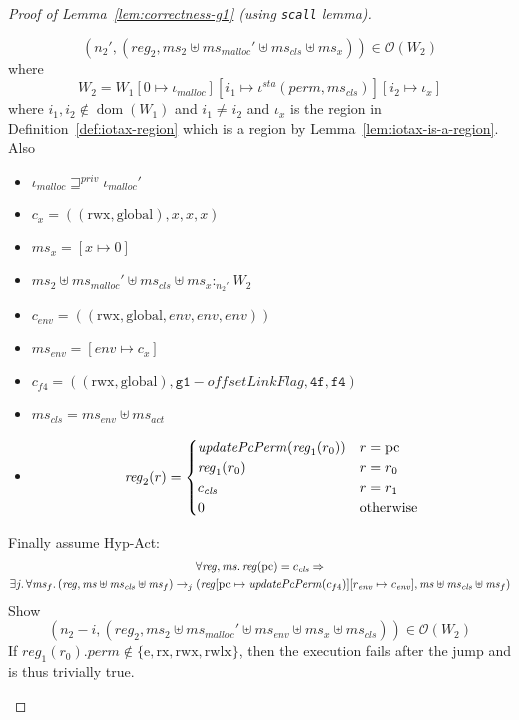 \documentclass[a4paper]{article}
\newcommand{\update}[2]{[#1 \mapsto #2]}
\DeclareMathOperator{\dom}{dom}
\newcommand{\var}[1]{\mathit{#1}}
\newcommand{\hs}{\var{ms}}
\newcommand{\ms}{\hs}
\newcommand{\pcreg}{\mathrm{pc}}
\newcommand{\reg}{\var{reg}}
\newcommand{\heap}{\var{mem}}
\newcommand{\perm}{\var{perm}}
\newcommand{\sta}{\var{sta}}
\newcommand{\olf}{\var{offsetLinkFlag}}
\newcommand{\env}{\var{env}}
\newcommand{\cls}{\var{cls}}
\newcommand{\act}{\var{act}}
\newcommand{\plainfun}[2]{
  \ifthenelse{\equal{#2}{}}
  {\mathit{#1}}
  {\mathit{#1}(#2)}
}
\newcommand{\updatePcPerm}[1]{\plainfun{updatePcPerm}{#1}}
\newcommand{\futurestr}{\mathbin{\sqsupseteq}^{\var{priv}}}
\newcommand{\heapSat}[3][\heap]{#1 :_{#2} #3}
\newcommand{\memSat}[3][n]{\heapSat[#2]{#1}{#3}}
\newcommand{\codelabel}[1]{\mathit{#1}}
\newcommand{\malloc}{\codelabel{malloc}}
\newcommand{\observations}{\mathcal{O}}
\newcommand{\npair}[2][n]{\left(#1,#2 \right)}
\newcommand{\plainperm}[1]{\mathrm{#1}}
\newcommand{\exec}{\plainperm{rx}}
\newcommand{\entry}{\plainperm{e}}
\newcommand{\rwx}{\plainperm{rwx}}
\newcommand{\rwlx}{\plainperm{rwlx}}
\newcommand{\glob}{\plainperm{global}}
\newcommand{\step}[1][]{\rightarrow_{#1}}
\begin{document}
\begin{proof}[Proof of Lemma~\ref{lem:correctness-g1} (using \texttt{scall} lemma)]
\begin{enumproof}[resume]
\begin{enumproof}
          \[
            \npair[n_2']{(\reg_2,\ms_2 \uplus \ms_\malloc' \uplus \ms_\cls \uplus \ms_x)} \in \observations(W_2)
          \]
          where
          \[
            W_2 = W_1\update{0}{\iota_\malloc}\update{i_1}{\iota^\sta (\perm,\ms_\cls)}\update{i_2}{\iota_x}
          \]
          where $i_1,i_2\not\in\dom(W_1)$ and $i_1 \neq i_2$ and $\iota_x$ is the region in Definition~\ref{def:iotax-region} which is a region by Lemma~\ref{lem:iotax-is-a-region}. Also
          \begin{itemize}
          \item $\iota_\malloc \futurestr \iota_\malloc'$
          \item $c_x = ((\rwx,\glob),x,x,x)$
          \item $\ms_x = [x \mapsto 0]$
          \item $\memSat[n_2']{\ms_2 \uplus \ms_\malloc' \uplus \ms_\cls \uplus \ms_x}{W_2}$
          \item $c_\env = ((\rwx,\glob,\env,\env,\env))$
          \item $\ms_\env = [\env \mapsto c_x]$
          \item $c_{f4} = ((\rwx,\glob),\mathtt{g1} - \olf,\mathtt{4f},\mathtt{f4})$
          \item $\ms_\cls = \ms_\env \uplus \ms_\act$
          \item 
            \begin{equation*}
              \reg_2(r) =
              \begin{cases}
                \updatePcPerm{\reg_1(r_0)} & r = \pcreg \\
                \reg_1(r_0) & r = r_0 \\
                c_\cls & r = r_1 \\
                0 & \text{otherwise}
              \end{cases}
            \end{equation*}
          \end{itemize}
          Finally assume Hyp-Act:
            \begin{multline}
            \label{eq:g1-hyp-act}
            \forall \reg,\ms \ldotp \reg(\pcreg)=c_\cls \Rightarrow\\
            \exists j \ldotp \forall \ms_f \ldotp (\reg,\ms \uplus \ms_\cls \uplus \ms_f) \step[j] (\reg\update{\pcreg}{\updatePcPerm{c_{f4}}}\update{r_\env}{c_\env},\ms \uplus \ms_\cls \uplus \ms_f)
          \end{multline}
          Show
          \begin{equation}
            \label{eq:g1-obs-to-show}
            \npair[n_2-i]{(\reg_2,\ms_2 \uplus \ms_\malloc' \uplus \ms_\env \uplus \ms_x \uplus \ms_\cls)} \in \observations(W_2)
          \end{equation}
          If $\reg_1(r_0).\perm \not\in \{\entry, \exec, \rwx, \rwlx\}$, then the execution fails after the jump and \label{eq:g1-obs-to-show} is thus trivially true.


\end{enumproof}
\end{enumproof}
\end{proof}
\end{document}
